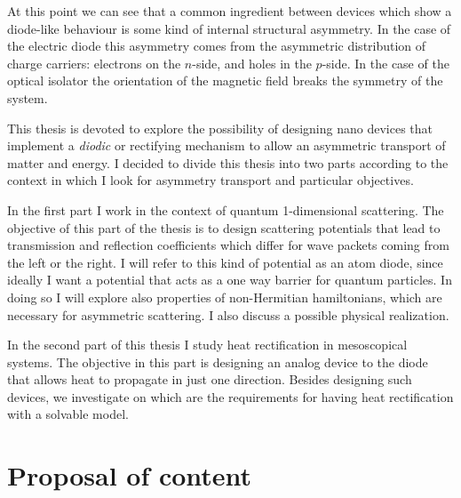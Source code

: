At this point we can see that a common ingredient between devices which show a diode-like behaviour is some kind of internal structural asymmetry. In the case of the electric diode this asymmetry comes from the asymmetric distribution of charge carriers: electrons on the $n$-side, and holes in the $p$-side. In the case of the optical isolator the orientation of the magnetic field breaks the symmetry of the system.

This thesis is devoted to explore the possibility of designing nano devices that implement a \textit{diodic} or rectifying mechanism to allow an asymmetric transport of matter and energy. I decided to divide this thesis into two parts according to the context in which I look for asymmetry transport and particular objectives.

In the first part I work in the context of quantum 1-dimensional scattering. The objective of this part of the thesis is to design scattering potentials that lead to transmission and reflection coefficients which differ for wave packets coming from the left or the right. I will refer to this kind of potential as an atom diode, since ideally I want a potential that acts as a one way barrier for quantum particles. In doing so I will explore also properties of non-Hermitian hamiltonians, which are necessary for asymmetric scattering. I also discuss a possible physical realization.

In the second part of this thesis I study heat rectification in mesoscopical systems. The objective in this part is designing an analog device to the diode that allows heat to propagate in just one direction. Besides designing such devices, we investigate on which are the requirements for having heat rectification with a solvable model.

\section*{Proposal of content}

